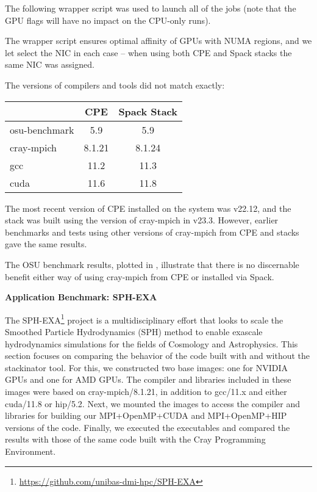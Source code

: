 The following wrapper script was used to launch all of the jobs (note that the GPU flags will have no impact on the CPU-only runs).

The wrapper script ensures optimal affinity of GPUs with NUMA regions, and we let \craympich select the NIC in each case -- when using both CPE and Spack stacks the same NIC was assigned.

The versions of compilers and tools did not match exactly:
\begin{center}
    \begin{tabular}{l |c  c }
                      & CPE   & Spack Stack \\
          \hline
        osu-benchmark & 5.9   & 5.9       \\
        cray-mpich    & 8.1.21& 8.1.24    \\
        gcc           & 11.2  & 11.3      \\
        cuda          & 11.6  & 11.8      \\
    \end{tabular}
\end{center}

The most recent version of CPE installed on the system was v22.12, and the stack was built using the version of cray-mpich in v23.3. However, earlier benchmarks and tests using other versions of cray-mpich from CPE and \spack stacks gave the same results.

The OSU benchmark results, plotted in , illustrate that there is no discernable benefit either way of using cray-mpich from CPE or installed via Spack.

\noindent\textbf{Application Benchmark: SPH-EXA}

The SPH-EXA\footnote{\url{https://github.com/unibas-dmi-hpc/SPH-EXA}} project is a multidisciplinary effort that looks to scale the Smoothed Particle Hydrodynamics (SPH) method to enable exascale hydrodynamics simulations for the fields of Cosmology and Astrophysics. 
This section focuses on comparing the behavior of the code built with and without the stackinator tool.
For this, we constructed two base images: one for NVIDIA GPUs and one for AMD GPUs.
The compiler and libraries included in these images were based on cray-mpich/8.1.21, in addition to gcc/11.x and either cuda/11.8 or hip/5.2.
Next, we mounted the images to access the compiler and libraries for building our MPI+OpenMP+CUDA and MPI+OpenMP+HIP versions of the code. Finally, we executed the executables and compared the results with those of the same code built with the Cray Programming Environment.

